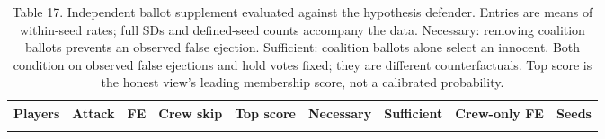 \documentclass[
  12pt,
]{article}
\begin{document}
\begin{landscape}

\begin{table}[p]
\centering
\caption{Table 17. Independent ballot supplement evaluated against the hypothesis
defender. Entries are means of within-seed rates; full SDs and
defined-seed counts accompany the data. Necessary: removing coalition
ballots prevents an observed false ejection. Sufficient: coalition
ballots alone select an innocent. Both condition on observed false
ejections and hold votes fixed; they are different counterfactuals. Top
score is the honest view's leading membership score, not a calibrated
probability.}\label{tab:17}
\begin{tabular}{@{}
  >{\raggedright\arraybackslash}p{}
  >{\raggedleft\arraybackslash}p{}
  >{\raggedleft\arraybackslash}p{}
  >{\raggedleft\arraybackslash}p{}
  >{\raggedleft\arraybackslash}p{}
  >{\raggedleft\arraybackslash}p{}
  >{\raggedleft\arraybackslash}p{}
  >{\raggedleft\arraybackslash}p{}
  >{\raggedleft\arraybackslash}p{}@{}}
\toprule\noalign{}
\begin{minipage}[b]{\linewidth}\raggedright
Players
\end{minipage} & \begin{minipage}[b]{\linewidth}\raggedleft
Attack
\end{minipage} & \begin{minipage}[b]{\linewidth}\raggedleft
FE
\end{minipage} & \begin{minipage}[b]{\linewidth}\raggedleft
Crew skip
\end{minipage} & \begin{minipage}[b]{\linewidth}\raggedleft
Top score
\end{minipage} & \begin{minipage}[b]{\linewidth}\raggedleft
Necessary
\end{minipage} & \begin{minipage}[b]{\linewidth}\raggedleft
Sufficient
\end{minipage} & \begin{minipage}[b]{\linewidth}\raggedleft
Crew-only FE
\end{minipage} & \begin{minipage}[b]{\linewidth}\raggedleft
Seeds
\end{minipage} \\
\midrule\noalign{}


\end{tabular}
\end{table}
\end{landscape}
\end{document}
